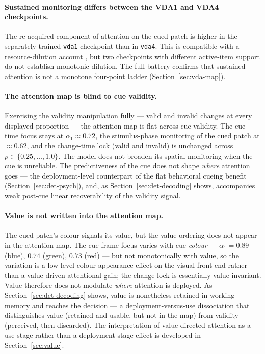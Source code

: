 \paragraph{Sustained monitoring differs between the VDA1 and VDA4 checkpoints.}
The re-acquired component of attention on the cued patch is higher in the separately
trained \texttt{vda1} checkpoint than in \texttt{vda4}. This is compatible with a
resource-dilution account \cite{reynolds_heeger2009_normalization,
carrasco2011_visual_attention_25y}, but two checkpoints with different active-item
support do not establish monotonic dilution. The full battery confirms that sustained
attention is not a monotone four-point ladder (Section~\ref{sec:vda-map}).

\paragraph{The attention map is blind to cue validity.}
Exercising the validity manipulation fully --- valid and invalid changes at every
displayed proportion --- the attention map is flat across cue validity. The cue-time
focus stays at $\alpha_1 \approx 0.72$, the stimulus-phase monitoring of the cued
patch at $\approx 0.62$, and the change-time lock (valid and invalid) is unchanged
across $p \in \{0.25, \ldots, 1.0\}$. The model does not broaden its spatial
monitoring when the cue is unreliable. The predictiveness of the cue does not shape
\emph{where} attention goes --- the deployment-level counterpart of the flat
behavioral cueing benefit (Section~\ref{sec:det-psych}), and, as
Section~\ref{sec:det-decoding} shows, accompanies weak post-cue linear recoverability
of the validity signal.

\paragraph{Value is not written into the attention map.}
The cued patch's colour signals its value, but the value ordering does not appear in
the attention map. The cue-frame focus varies with cue \emph{colour} --- $\alpha_1 =
0.89$ (blue), $0.74$ (green), $0.73$ (red) --- but not monotonically with value, so
the variation is a low-level colour-appearance effect on the visual front-end rather
than a value-driven attentional gain; the change-lock is essentially value-invariant.
Value therefore does not modulate \emph{where} attention is deployed. As
Section~\ref{sec:det-decoding} shows, value is nonetheless retained in working
memory and reaches the decision --- a deployment-versus-use dissociation that
distinguishes value (retained and usable, but not in the map) from validity
(perceived, then discarded). The interpretation of value-directed attention as a
use-stage rather than a deployment-stage effect is developed in
Section~\ref{sec:value}.

